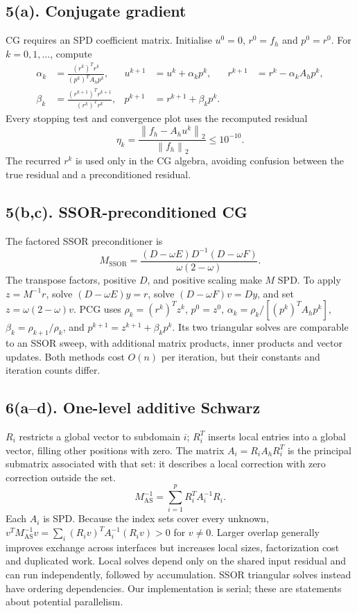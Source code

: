 \documentclass[10pt,a4paper]{article}
\newcommand{\norm}[1]{\left\lVert#1\right\rVert}
\newcommand{\Ah}{A_h}
\newcommand{\fh}{f_h}
\begin{document}
\subsection{5(a). Conjugate gradient}
CG requires an SPD coefficient matrix. Initialise $u^0=0$,
$r^0=\fh$ and $p^0=r^0$. For $k=0,1,\ldots$, compute
\begin{align*}
 \alpha_k&=\frac{(r^k)^Tr^k}{(p^k)^T\Ah p^k}, &
 u^{k+1}&=u^k+\alpha_kp^k, &
 r^{k+1}&=r^k-\alpha_k\Ah p^k,\\
 \beta_k&=\frac{(r^{k+1})^Tr^{k+1}}{(r^k)^Tr^k}, &
 p^{k+1}&=r^{k+1}+\beta_kp^k.
\end{align*}
Every stopping test and convergence plot uses the recomputed residual
\begin{equation}
 \eta_k=\frac{\norm{\fh-\Ah u^k}_2}{\norm{\fh}_2}\leq10^{-10}.
 \label{eq:stop}
\end{equation}
The recurred $r^k$ is used only in the CG algebra, avoiding confusion
between the true residual and a preconditioned residual.

\subsection{5(b,c). SSOR-preconditioned CG}
The factored SSOR preconditioner is
\begin{equation}
 M_{\mathrm{SSOR}}=\frac{(D-\omega E)D^{-1}(D-\omega F)}{\omega(2-\omega)}.
 \label{eq:ssorM}
\end{equation}
The transpose factors, positive $D$, and positive scaling make $M$ SPD.
To apply $z=M^{-1}r$, solve $(D-\omega E)y=r$, solve
$(D-\omega F)v=Dy$, and set $z=\omega(2-\omega)v$.
PCG uses $\rho_k=(r^k)^Tz^k$, $p^0=z^0$,
$\alpha_k=\rho_k/[(p^k)^T\Ah p^k]$,
$\beta_k=\rho_{k+1}/\rho_k$, and $p^{k+1}=z^{k+1}+\beta_kp^k$.
Its two triangular solves are comparable to an SSOR sweep, with additional
matrix products, inner products and vector updates. Both methods cost
$O(n)$ per iteration, but their constants and iteration counts differ.

\subsection{6(a--d). One-level additive Schwarz}
$R_i$ restricts a global vector to subdomain $i$; $R_i^T$ inserts local
entries into a global vector, filling other positions with zero. The matrix
$A_i=R_i\Ah R_i^T$ is the principal submatrix associated with that set:
it describes a local correction with zero correction outside the set.
\[
 M_{\mathrm{AS}}^{-1}=\sum_{i=1}^pR_i^TA_i^{-1}R_i.
\]
Each $A_i$ is SPD. Because the index sets cover every unknown,
$v^TM_{\mathrm{AS}}^{-1}v=\sum_i(R_iv)^TA_i^{-1}(R_iv)>0$ for $v\ne0$.
Larger overlap generally improves exchange across interfaces but increases
local sizes, factorization cost and duplicated work. Local solves depend
only on the shared input residual and can run independently, followed by
accumulation. SSOR triangular solves instead have ordering dependencies.
Our implementation is serial; these are statements about potential parallelism.
\end{document}
